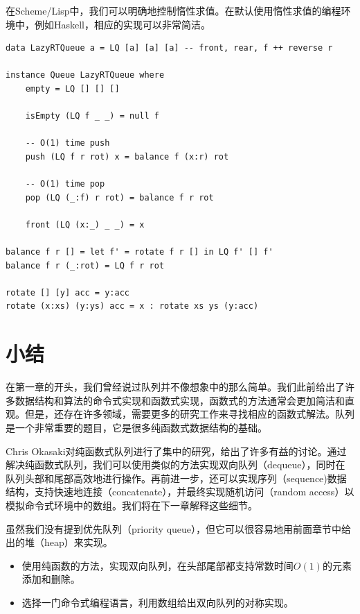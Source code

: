 \documentclass[b5paper]{ctexart}
\begin{document}
在Scheme/Lisp中，我们可以明确地控制惰性求值。在默认使用惰性求值的编程环境中，例如Haskell，相应的实现可以非常简洁。

\lstset{language=Haskell}
\begin{lstlisting}[style=Haskell]
data LazyRTQueue a = LQ [a] [a] [a] -- front, rear, f ++ reverse r

instance Queue LazyRTQueue where
    empty = LQ [] [] []

    isEmpty (LQ f _ _) = null f

    -- O(1) time push
    push (LQ f r rot) x = balance f (x:r) rot

    -- O(1) time pop
    pop (LQ (_:f) r rot) = balance f r rot

    front (LQ (x:_) _ _) = x

balance f r [] = let f' = rotate f r [] in LQ f' [] f'
balance f r (_:rot) = LQ f r rot

rotate [] [y] acc = y:acc
rotate (x:xs) (y:ys) acc = x : rotate xs ys (y:acc)
\end{lstlisting}

\section{小结}

在第一章的开头，我们曾经说过队列并不像想象中的那么简单。我们此前给出了许多数据结构和算法的命令式实现和函数式实现，函数式的方法通常会更加简洁和直观。但是，还存在许多领域，需要更多的研究工作来寻找相应的函数式解法。队列是一个非常重要的题目，它是很多纯函数式数据结构的基础。

Chris Okasaki对纯函数式队列进行了集中的研究，给出了许多有益的讨论\cite{okasaki-book}。通过解决纯函数式队列，我们可以使用类似的方法实现双向队列（dequeue），同时在队列头部和尾部高效地进行操作。再前进一步，还可以实现序列（sequence)数据结构，支持快速地连接（concatenate），并最终实现随机访问（random access）以模拟命令式环境中的数组。我们将在下一章解释这些细节。

虽然我们没有提到优先队列（priority queue），但它可以很容易地用前面章节中给出的堆（heap）来实现。

\begin{Exercise}
\begin{itemize}
\item 使用纯函数的方法，实现双向队列，在头部尾部都支持常数时间$O(1)$的元素添加和删除。
\item 选择一门命令式编程语言，利用数组给出双向队列的对称实现。
\end{itemize}
\end{Exercise}
\end{document}
